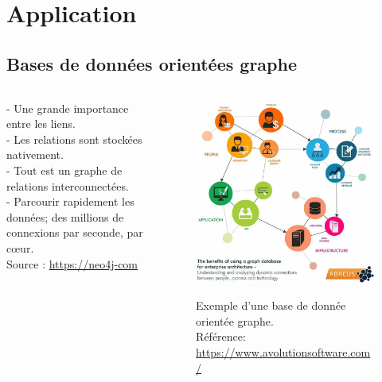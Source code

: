 \documentclass[10pt]{beamer}
\begin{document}
\section[Application]{Application} 
\subsection{Bases de données orientées graphe}
\begin{frame}{}
    \centering
    \begin{columns}
    \begin{column}{0.4\textwidth}
        \begin{minipage}{0.9\textwidth}
        \begin{block}{}
        - Une grande importance entre les liens. \\[.2cm]
        - Les relations sont stockées nativement. \\[.2cm]
        - Tout est un graphe de relations interconnectées.\\[.2cm]
        - Parcourir rapidement les données; des millions de connexions par seconde, par cœur.\\[.2cm]
        Source : \url{https://neo4j-com}
        \end{block}
        \end{minipage}
    \end{column}
        
\begin{column}{0.6\textwidth}
        \begin{figure}
		\centering
		\includegraphics[height=0.8\textheight]{moti1.png}\\[-.2cm]
\caption[caption]{Exemple d'une base de donnée orientée graphe. \\\vspace*{0.1cm} Référence: \url{https://www.avolutionsoftware.com/}}	
	\end{figure}
\end{column}
\end{columns} 


\end{frame}
\end{document}
